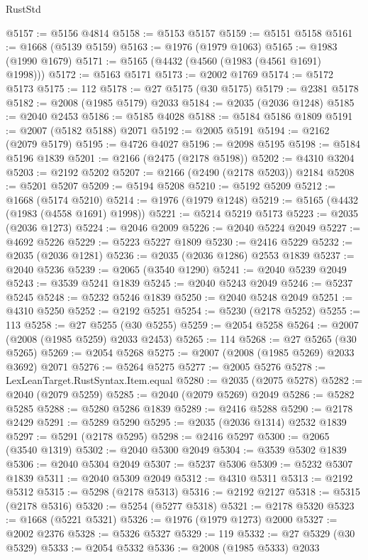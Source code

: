 \begin{lexlean}{RustStd}
\begin{coremodule}
@5157 := @5156 @4814
@5158 := @5153 @5157
@5159 := @5151 @5158
@5161 := @1668 (@5139 @5159)
@5163 := @1976 (@1979 @1063)
@5165 := @1983 (@1990 @1679)
@5171 := @5165 (@4432 (@4560 (@1983 (@4561 @1691) @1998)))
@5172 := @5163 @5171
@5173 := @2002 @1769
@5174 := @5172 @5173
@5175 := 112
@5178 := @27 @5175 (@30 @5175)
@5179 := @2381 @5178
@5182 := @2008 (@1985 @5179) @2033
@5184 := @2035 (@2036 @1248)
@5185 := @2040 @2453
@5186 := @5185 @4028
@5188 := @5184 @5186 @1809
@5191 := @2007 (@5182 @5188) @2071
@5192 := @2005 @5191
@5194 := @2162 (@2079 @5179)
@5195 := @4726 @4027
@5196 := @2098 @5195
@5198 := @5184 @5196 @1839
@5201 := @2166 (@2475 (@2178 @5198))
@5202 := @4310 @3204
@5203 := @2192 @5202
@5207 := @2166 (@2490 (@2178 @5203)) @2184
@5208 := @5201 @5207
@5209 := @5194 @5208
@5210 := @5192 @5209
@5212 := @1668 (@5174 @5210)
@5214 := @1976 (@1979 @1248)
@5219 := @5165 (@4432 (@1983 (@4558 @1691) @1998))
@5221 := @5214 @5219 @5173
@5223 := @2035 (@2036 @1273)
@5224 := @2046 @2009
@5226 := @2040 @5224 @2049
@5227 := @4692 @5226
@5229 := @5223 @5227 @1809
@5230 := @2416 @5229
@5232 := @2035 (@2036 @1281)
@5236 := @2035 (@2036 @1286) @2553 @1839
@5237 := @2040 @5236
@5239 := @2065 (@3540 @1290)
@5241 := @2040 @5239 @2049
@5243 := @3539 @5241 @1839
@5245 := @2040 @5243 @2049
@5246 := @5237 @5245
@5248 := @5232 @5246 @1839
@5250 := @2040 @5248 @2049
@5251 := @4310 @5250
@5252 := @2192 @5251
@5254 := @5230 (@2178 @5252)
@5255 := 113
@5258 := @27 @5255 (@30 @5255)
@5259 := @2054 @5258
@5264 := @2007 (@2008 (@1985 @5259) @2033 @2453)
@5265 := 114
@5268 := @27 @5265 (@30 @5265)
@5269 := @2054 @5268
@5275 := @2007 (@2008 (@1985 @5269) @2033 @3692) @2071
@5276 := @5264 @5275
@5277 := @2005 @5276
@5278 := LexLeanTarget.RustSyntax.Item.equal
@5280 := @2035 (@2075 @5278)
@5282 := @2040 (@2079 @5259)
@5285 := @2040 (@2079 @5269) @2049
@5286 := @5282 @5285
@5288 := @5280 @5286 @1839
@5289 := @2416 @5288
@5290 := @2178 @2429
@5291 := @5289 @5290
@5295 := @2035 (@2036 @1314) @2532 @1839
@5297 := @5291 (@2178 @5295)
@5298 := @2416 @5297
@5300 := @2065 (@3540 @1319)
@5302 := @2040 @5300 @2049
@5304 := @3539 @5302 @1839
@5306 := @2040 @5304 @2049
@5307 := @5237 @5306
@5309 := @5232 @5307 @1839
@5311 := @2040 @5309 @2049
@5312 := @4310 @5311
@5313 := @2192 @5312
@5315 := @5298 (@2178 @5313)
@5316 := @2192 @2127
@5318 := @5315 (@2178 @5316)
@5320 := @5254 (@5277 @5318)
@5321 := @2178 @5320
@5323 := @1668 (@5221 @5321)
@5326 := @1976 (@1979 @1273) @2000
@5327 := @2002 @2376
@5328 := @5326 @5327
@5329 := 119
@5332 := @27 @5329 (@30 @5329)
@5333 := @2054 @5332
@5336 := @2008 (@1985 @5333) @2033

\end{coremodule}
\end{lexlean}
